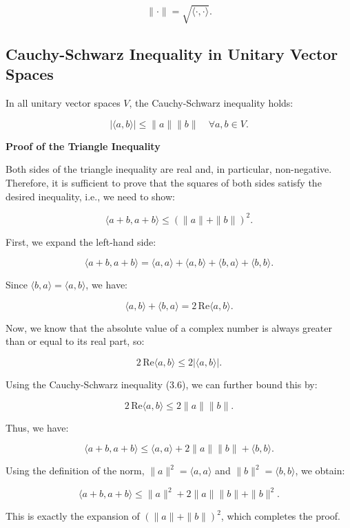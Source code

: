 \[
\| \cdot \| = \sqrt{\langle \cdot, \cdot \rangle}.
\]

\subsection{Cauchy-Schwarz Inequality in Unitary Vector Spaces}

In all unitary vector spaces \( V \), the Cauchy-Schwarz inequality holds:

\[
| \langle a, b \rangle | \leq \| a \| \| b \| \quad \forall a, b \in V.
\]

\textbf{Proof of the Triangle Inequality}

Both sides of the triangle inequality are real and, in particular, non-negative. Therefore, it is sufficient to prove that the squares of both sides satisfy the desired inequality, i.e., we need to show:

\[
\langle a + b, a + b \rangle \leq (\|a\| + \|b\|)^2.
\]

First, we expand the left-hand side:

\[
\langle a + b, a + b \rangle = \langle a, a \rangle + \langle a, b \rangle + \langle b, a \rangle + \langle b, b \rangle.
\]

Since \( \langle b, a \rangle = \langle a, b \rangle \), we have:

\[
\langle a, b \rangle + \langle b, a \rangle = 2 \, \text{Re} \langle a, b \rangle.
\]

Now, we know that the absolute value of a complex number is always greater than or equal to its real part, so:

\[
2 \, \text{Re} \langle a, b \rangle \leq 2 |\langle a, b \rangle|.
\]

Using the Cauchy-Schwarz inequality (3.6), we can further bound this by:

\[
2 \, \text{Re} \langle a, b \rangle \leq 2 \|a\| \|b\|.
\]

Thus, we have:

\[
\langle a + b, a + b \rangle \leq \langle a, a \rangle + 2 \|a\| \|b\| + \langle b, b \rangle.
\]

Using the definition of the norm, \( \|a\|^2 = \langle a, a \rangle \) and \( \|b\|^2 = \langle b, b \rangle \), we obtain:

\[
\langle a + b, a + b \rangle \leq \|a\|^2 + 2 \|a\| \|b\| + \|b\|^2.
\]

This is exactly the expansion of \( (\|a\| + \|b\|)^2 \), which completes the proof.
\QED
\newpage


